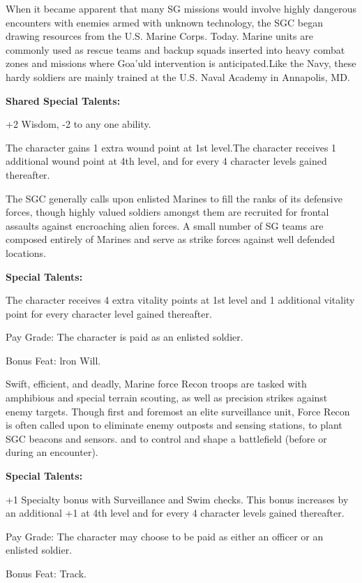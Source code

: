 When it became apparent that many SG missions would involve highly dangerous encounters with enemies armed with unknown technology, the SGC began drawing resources from the U.S. Marine Corps. Today. Marine units are commonly used as rescue teams and backup squads inserted into heavy combat zones and missions where Goa'uld intervention is anticipated.Like the Navy, these hardy soldiers are mainly trained at the U.S. Naval Academy in Annapolis, MD.

\textbf{Shared Special Talents:}
\begin{itemize*}
\item +2 Wisdom, -2 to any one ability.
\item The character gains 1 extra wound point at 1st level.The character receives 1 additional wound point at 4th level, and for every 4 character levels gained thereafter.
\end{itemize*}

The SGC generally calls upon enlisted Marines to fill the ranks of its defensive forces, though highly valued soldiers amongst them are recruited for frontal assaults against encroaching alien forces. A small number of SG teams are composed entirely of Marines and serve as strike forces against well defended locations.

\textbf{Special Talents:}
\begin{itemize*}
\item The character receives 4 extra vitality points at 1st level and 1 additional vitality point for every character level gained thereafter.
\item Pay Grade: The character is paid as an enlisted soldier.
\item Bonus Feat: lron Will.
\end{itemize*}

Swift, efficient, and deadly, Marine force Recon troops are tasked with amphibious and special terrain scouting, as well as precision strikes against enemy targets. Though first and foremost an elite surveillance unit, Force Recon is often called upon to eliminate enemy outposts and sensing stations, to plant SGC beacons and sensors. and to control and shape a battlefield (before or during an encounter).

\textbf{Special Talents:}
\begin{itemize*}
\item +1 Specialty bonus with Surveillance and Swim checks. This bonus increases by an additional +1 at 4th level and for every 4 character levels gained thereafter.
\item Pay Grade: The character may choose to be paid as either an officer or an enlisted soldier.
\item Bonus Feat: Track.
\end{itemize*}

